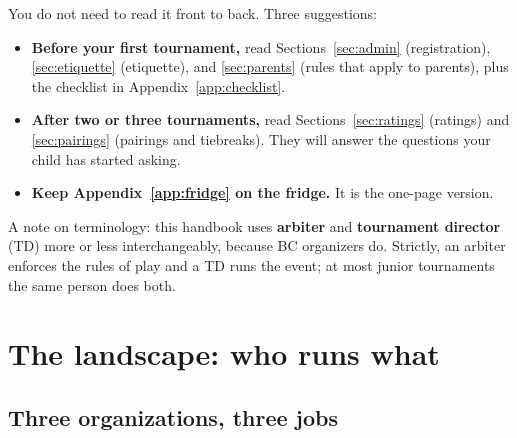\documentclass[10pt,letterpaper]{article}
\newcommand{\term}[1]{\textbf{#1}}
\begin{document}
You do not need to read it front to back. Three suggestions:

\begin{itemize}
  \item \textbf{Before your first tournament,} read Sections~\ref{sec:admin}
        (registration), \ref{sec:etiquette} (etiquette), and
        \ref{sec:parents} (rules that apply to parents), plus the checklist in
        Appendix~\ref{app:checklist}.
  \item \textbf{After two or three tournaments,} read
        Sections~\ref{sec:ratings} (ratings) and \ref{sec:pairings} (pairings
        and tiebreaks). They will answer the questions your child has started
        asking.
  \item \textbf{Keep Appendix~\ref{app:fridge} on the fridge.} It is the
        one-page version.
\end{itemize}

A note on terminology: this handbook uses \term{arbiter} and \term{tournament
director} (TD) more or less interchangeably, because BC organizers do. Strictly,
an arbiter enforces the rules of play and a TD runs the event; at most junior
tournaments the same person does both.

\section{The landscape: who runs what}

\subsection{Three organizations, three jobs}
\end{document}
